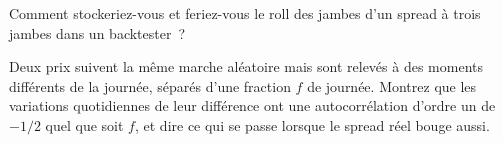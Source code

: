 \begin{interviewq}\label{iq:s2:commodity-spreads:5}
Comment stockeriez-vous et feriez-vous le roll des jambes d'un spread à trois jambes dans un backtester~?
\end{interviewq}

\begin{interviewq}\label{iq:s2:commodity-spreads:6}
Deux prix suivent la même marche aléatoire mais sont relevés à des moments différents de la journée, séparés d'une fraction $f$ de journée. Montrez que les variations quotidiennes
de leur différence ont une autocorrélation d'ordre un de $-1/2$ quel que soit $f$, et dire ce qui se passe lorsque le spread réel bouge aussi.
\end{interviewq}
